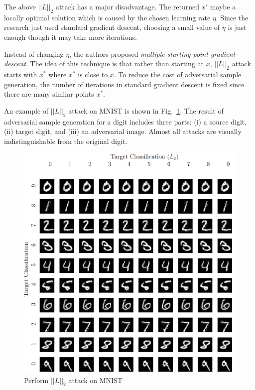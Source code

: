 \documentclass[12pt]{article}
\begin{document}
The above $||L||_2$ attack has a major disadvantage. The returned $x'$ maybe a locally optimal solution which is caused by the chosen learning rate $\eta$. Since the research just used standard gradient descent, choosing a small value of $\eta$ is just enough though it may take more iterations.

Instead of changing $\eta$, the authors proposed \textit{multiple starting-point gradient descent}. The idea of this technique is that rather than starting at $x$, $||L||_2$ attack starts with $x^* $ where $x^*$ is close to $x$. To reduce the cost of adversarial sample generation, the number of iterations in standard gradient descent is fixed since there are many similar points $x^*$.



An example of $||L||_2$ attack on MNIST is shown in Fig.~\ref{fig:L2-attack-sample}. The result of adversarial sample generation for a digit includes three parts: (i) a source digit, (ii) target digit, and (iii) an adversarial image. Almost all attacks are visually indistinguishable from the original digit.

\begin{figure}[h]
	\centering
	\caption{Perform $||L||_2$ attack on MNIST}
	\label{fig:L2-attack-sample}
	\includegraphics[scale=0.5]{img/L2-attack-sample}
\end{figure}
\end{document}
